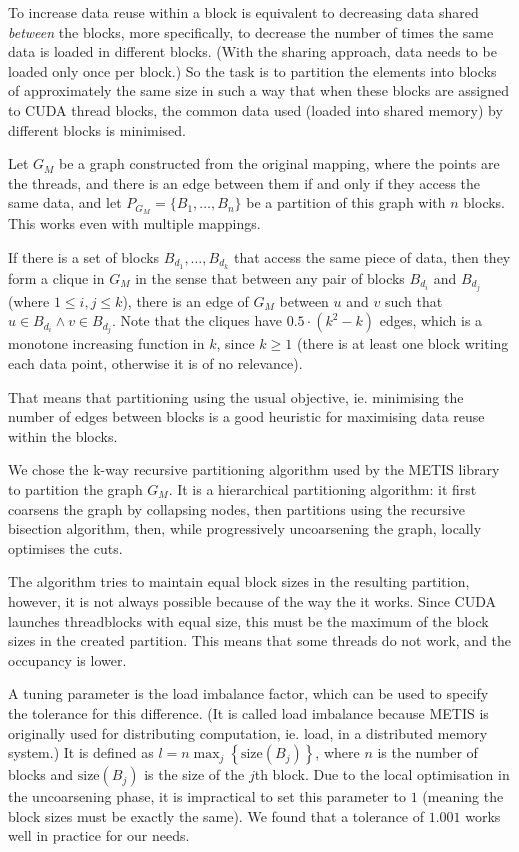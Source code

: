 To increase data reuse within a block is equivalent to decreasing data shared
\emph{between} the blocks, more specifically, to decrease the number of times
the same data is loaded in different blocks. (With the sharing approach, data
needs to be loaded only once per block.) So the task is to partition the
elements into blocks of approximately the same size in such a way that when
these blocks are assigned to CUDA thread blocks, the common data used (loaded
into shared memory) by different blocks is minimised.

Let $G_M$ be a graph constructed from the original mapping, where the points are
the threads, and there is an edge between them if and only if they access the
same data, and let $P_{G_M} = \{B_1, \ldots, B_n\}$ be a partition of this graph
with $n$ blocks. This works even with multiple mappings.

If there is a set of blocks $B_{d_1}, \ldots, B_{d_k}$ that access the same
piece of data, then they form a clique in $G_M$ in the sense that between any
pair of blocks $B_{d_i}$ and $B_{d_j}$ (where $1 \le i,j \le k$), there is an
edge of $G_M$ between $u$ and $v$ such that $u \in B_{d_i} \wedge v \in
B_{d_j}$. Note that the cliques have $0.5 \cdot (k^2 - k)$ edges, which is a
monotone increasing function in $k$, since $k \ge 1$ (there is at least one
block writing each data point, otherwise it is of no relevance).

That means that partitioning using the usual objective, ie. minimising the
number of edges between blocks is a good heuristic for maximising data reuse
within the blocks.

We chose the k-way recursive partitioning algorithm used by the
METIS\cite{metis} library to partition the graph $G_M$. It is a hierarchical
partitioning algorithm: it first coarsens the graph by collapsing nodes, then
partitions using the recursive bisection algorithm, then, while progressively
uncoarsening the graph, locally optimises the cuts.

The algorithm tries to maintain equal block sizes in the resulting partition,
however, it is not always possible because of the way the it works. Since CUDA
launches threadblocks with equal size, this must be the maximum of the block
sizes in the created partition. This means that some threads do not work, and
the occupancy is lower.

A tuning parameter is the load imbalance factor, which can be used to specify
the tolerance for this difference. (It is called load imbalance because METIS is
originally used for distributing computation, ie. load, in a distributed memory
system.) It is defined as $l = n\max_j \left\{\mathrm{size}(B_j) \right\}$,
where $n$ is the number of blocks and $\mathrm{size}(B_j)$ is the size of the
$j$th block. Due to the local optimisation in the uncoarsening phase, it is
impractical to set this parameter to $1$ (meaning the block sizes must be
exactly the same). We found that a tolerance of $1.001$ works well in practice
for our needs.

